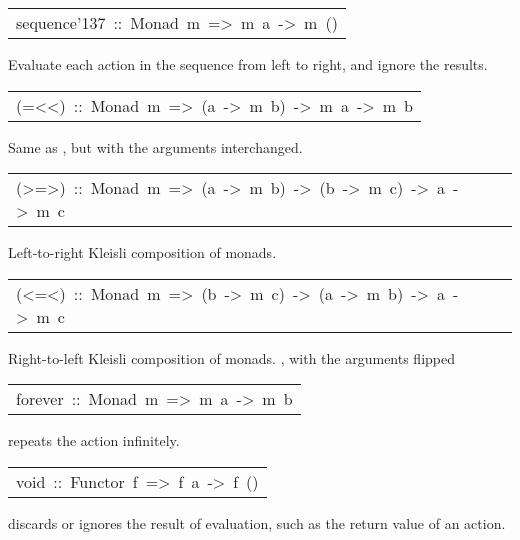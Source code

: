 \begin{haddockdesc}
\item[\begin{tabular}{@{}l}
sequence{\char '137}\ ::\ Monad\ m\ =>\ {\char 91}m\ a{\char 93}\ ->\ m\ ()
\end{tabular}]\haddockbegindoc
Evaluate each action in the sequence from left to right,
 and ignore the results.
\par

\end{haddockdesc}
\begin{haddockdesc}
\item[\begin{tabular}{@{}l}
(=<<)\ ::\ Monad\ m\ =>\ (a\ ->\ m\ b)\ ->\ m\ a\ ->\ m\ b
\end{tabular}]\haddockbegindoc
Same as \haddockid{>>=}, but with the arguments interchanged.
\par

\end{haddockdesc}
\begin{haddockdesc}
\item[\begin{tabular}{@{}l}
(>=>)\ ::\ Monad\ m\ =>\ (a\ ->\ m\ b)\ ->\ (b\ ->\ m\ c)\ ->\ a\ ->\ m\ c
\end{tabular}]\haddockbegindoc
Left-to-right Kleisli composition of monads.
\par

\end{haddockdesc}
\begin{haddockdesc}
\item[\begin{tabular}{@{}l}
(<=<)\ ::\ Monad\ m\ =>\ (b\ ->\ m\ c)\ ->\ (a\ ->\ m\ b)\ ->\ a\ ->\ m\ c
\end{tabular}]\haddockbegindoc
Right-to-left Kleisli composition of monads. \haddocktt{(>=>)}, with the arguments flipped
\par

\end{haddockdesc}
\begin{haddockdesc}
\item[\begin{tabular}{@{}l}
forever\ ::\ Monad\ m\ =>\ m\ a\ ->\ m\ b
\end{tabular}]\haddockbegindoc
{} repeats the action infinitely.
\par

\end{haddockdesc}
\begin{haddockdesc}
\item[\begin{tabular}{@{}l}
void\ ::\ Functor\ f\ =>\ f\ a\ ->\ f\ ()
\end{tabular}]\haddockbegindoc
{} discards or ignores the result of evaluation, such as the return value of an  action.
\par

\end{haddockdesc}
